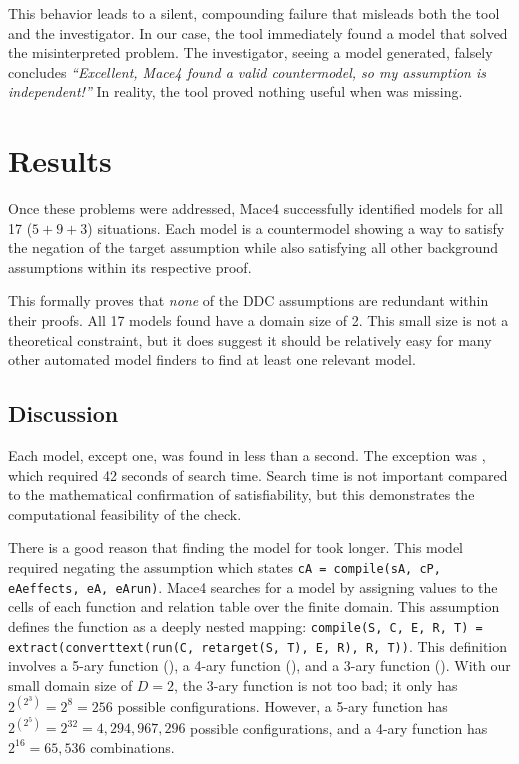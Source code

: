 This behavior leads to a silent, compounding failure that misleads both the tool and the investigator. In our case, the tool immediately found a model that solved the misinterpreted problem. The investigator, seeing a model generated, falsely concludes \emph{``Excellent, Mace4 found a valid countermodel, so my assumption is independent!''} In reality, the tool proved nothing useful when  was missing.

\section{Results}

Once these problems were addressed, Mace4 successfully identified models for all 17 ($5+9+3$) situations. Each model is a countermodel showing a way to satisfy the negation of the target assumption while also satisfying all other background assumptions within its respective proof.

This formally proves that \emph{none} of the DDC assumptions are redundant within their proofs. All 17 models found have a domain size of 2. This small size is not a theoretical constraint, but it does suggest it should be relatively easy for many other automated model finders to find at least one relevant model.

\subsection{Discussion}

Each model, except one, was found in less than a second. The exception was , which required 42 seconds of search time. Search time is not important compared to the mathematical confirmation of satisfiability, but this demonstrates the computational feasibility of the check.

There is a good reason that finding the model for  took longer. This model required negating the assumption  which states \texttt{cA = compile(sA, cP, eAeffects, eA, eArun)}. Mace4 searches for a model by assigning values to the cells of each function and relation table over the finite domain. This assumption defines the  function as a deeply nested mapping:
\texttt{compile(S, C,\allowbreak{} E,\allowbreak{} R, T) =\allowbreak{} extract(\allowbreak{}converttext(\allowbreak{}run(C,\allowbreak{} retarget(S, T),\allowbreak{} E, R),\allowbreak{} R, T))}.
This definition involves a 5-ary function (), a 4-ary function (), and a 3-ary function (). With our small domain size of $D = 2$, the 3-ary function is not too bad; it only has $2^{(2^3)} = 2^{8} = 256$ possible configurations. However, a 5-ary function has $2^{(2^5)} = 2^{32} = 4{,}294{,}967{,}296$ possible configurations, and a 4-ary function has $2^{16} = 65{,}536$ combinations.

